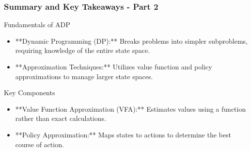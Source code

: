 \documentclass[aspectratio=169]{beamer}
\begin{document}
\begin{frame}[fragile]
    \frametitle{Summary and Key Takeaways - Part 2}
    \begin{block}{Fundamentals of ADP}
        \begin{itemize}
            \item **Dynamic Programming (DP):** Breaks problems into simpler subproblems, requiring knowledge of the entire state space.
            \item **Approximation Techniques:** Utilizes value function and policy approximations to manage larger state spaces.
        \end{itemize}
    \end{block}

    \begin{block}{Key Components}
        \begin{itemize}
            \item **Value Function Approximation (VFA):** Estimates values using a function rather than exact calculations.
            \item **Policy Approximation:** Maps states to actions to determine the best course of action.
        \end{itemize}
    \end{block}
\end{frame}
\end{document}

